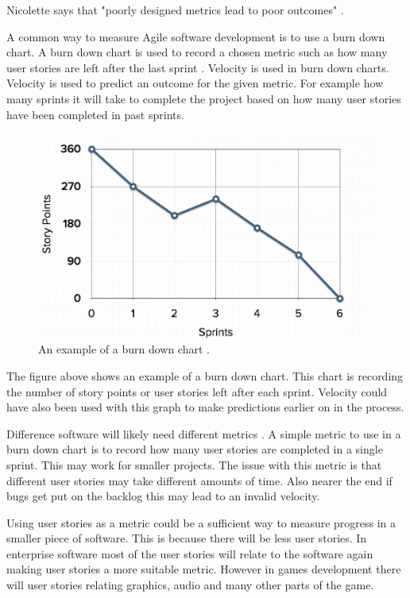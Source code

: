 \documentclass{scrartcl}
\begin{document}
Nicolette says that "poorly designed metrics lead to poor outcomes" \cite[p.2]{Ktata}.

A common way to measure Agile software development is to use a burn down chart. A burn down chart is used to record a chosen metric such as how many user stories are left after the last sprint \cite{AgileWithScrum}. Velocity is used in burn down charts. Velocity is used to predict an outcome for the given metric. For example how many sprints it will take to complete the project based on how many user stories have been completed in past sprints.

\begin{figure}[h]
	\includegraphics[width=1.0\linewidth]{BDChart.jpg}
	\caption{ An example of a burn down chart \cite{MGS}.}
\end{figure}
	
The figure above shows an example of a burn down chart. This chart is recording the number of story points or user stories left after each sprint. Velocity could have also been used with this graph to make predictions earlier on in the process. 

Difference software will likely need different metrics  \cite{Misra}. %
 A simple metric to use in a burn down chart is to record how many user stories are completed in a single sprint. This may work for smaller projects. The issue with this metric is that different user stories may take different amounts of time. Also nearer the end if bugs get put on the backlog this may lead to an invalid velocity.

Using user stories as a metric could be a sufficient way to measure progress in a smaller piece of software. This is because there will be less user stories. In enterprise software most of the user stories will relate to the software again making user stories a more suitable metric. However in games development there will user stories relating graphics, audio and many other parts of the game. 
\end{document}

